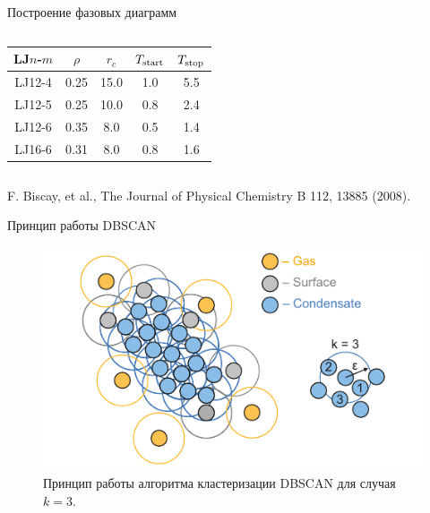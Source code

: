 \documentclass{beamer} %
\begin{document}
\begin{frame}{Построение фазовых диаграмм}
{\begin{columns}
\begin{column}{0.48\linewidth}
        \vspace{0.5cm}

        \begin{table}[h!]
          \footnotesize
          \centering
          \begin{tabular}{c|c|c|c|c}
            LJ$n$-$m$ & $\rho$ & $r_c$ & $T_{\rm start}$ & $T_{\rm stop}$ \\ \hline
            LJ12-4 & 0.25 & 15.0 & 1.0 & 5.5 \\
            LJ12-5 & 0.25 & 10.0 & 0.8 & 2.4\\
            LJ12-6 & 0.35 & 8.0 & 0.5 & 1.4\\
            LJ16-6 & 0.31 & 8.0 & 0.8 & 1.6\\
          \end{tabular}

          \label{MACR-Table1}
        \end{table}

      \end{column}
      \begin{column}{0.001\linewidth}
      \end{column}
    \end{columns}
  }

  \vspace{0.5cm}
  \tiny{F. Biscay, et al., The Journal of Physical Chemistry B 112, 13885 (2008).}

\end{frame}




\begin{frame}{Принцип работы DBSCAN}
  \footnotesize{

    \begin{figure}[!t]
      \centering
      \includegraphics[width=0.9\linewidth]{kepsilon.pdf}
      \caption{Принцип работы алгоритма кластеризации DBSCAN для случая $k = 3$.}
      \label{kepsilon}
    \end{figure}
  }

\end{frame}
\end{document}
